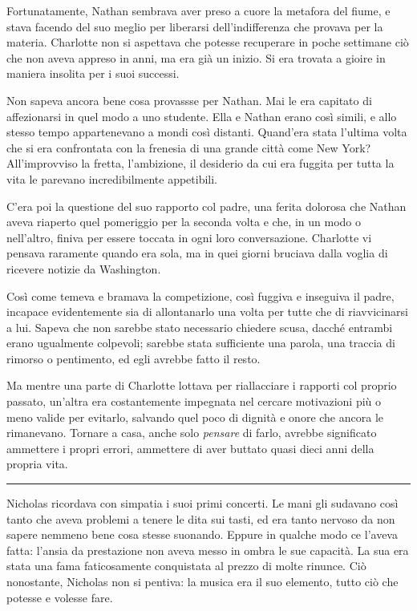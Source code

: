 \documentclass[a4paper,oneside,11pt]{memoir}
\begin{document}
Fortunatamente, Nathan sembrava aver preso a cuore la metafora del fiume, e
stava facendo del suo meglio per liberarsi dell'indifferenza che provava per la
materia. Charlotte non si aspettava che potesse recuperare in poche settimane
ciò che non aveva appreso in anni, ma era già un inizio. Si era trovata a gioire
in maniera insolita per i suoi successi.

Non sapeva ancora bene cosa provassse per Nathan. Mai le era capitato di
affezionarsi in quel modo a uno studente. Ella e Nathan erano così simili, e
allo stesso tempo appartenevano a mondi così distanti. Quand'era stata l'ultima
volta che si era confrontata con la frenesia di una grande città come New York?
All'improvviso la fretta, l'ambizione, il desiderio da cui era fuggita per tutta
la vita le parevano incredibilmente appetibili.

C'era poi la questione del suo rapporto col padre, una ferita dolorosa che
Nathan aveva riaperto quel pomeriggio per la seconda volta e che, in un modo o
nell'altro, finiva per essere toccata in ogni loro conversazione. Charlotte vi
pensava raramente quando era sola, ma in quei giorni bruciava dalla voglia di
ricevere notizie da Washington.

Così come temeva e bramava la competizione, così fuggiva e inseguiva il padre,
incapace evidentemente sia di allontanarlo una volta per tutte che di
riavvicinarsi a lui. Sapeva che non sarebbe stato necessario chiedere scusa,
dacché entrambi erano ugualmente colpevoli; sarebbe stata sufficiente una
parola, una traccia di rimorso o pentimento, ed egli avrebbe fatto il resto.

Ma mentre una parte di Charlotte lottava per riallacciare i rapporti col proprio
passato, un'altra era costantemente impegnata nel cercare motivazioni più o meno
valide per evitarlo, salvando quel poco di dignità e onore che ancora le
rimanevano. Tornare a casa, anche solo \emph{pensare} di farlo, avrebbe
significato ammettere i propri errori, ammettere di aver buttato quasi dieci
anni della propria vita.

\plainbreak{1}

Nicholas ricordava con simpatia i suoi primi concerti. Le mani gli sudavano così
tanto che aveva problemi a tenere le dita sui tasti, ed era tanto nervoso da non
sapere nemmeno bene cosa stesse suonando. Eppure in qualche modo ce l'aveva
fatta: l'ansia da prestazione non aveva messo in ombra le sue capacità. La sua
era stata una fama faticosamente conquistata al prezzo di molte rinunce. Ciò
nonostante, Nicholas non si pentiva: la musica era il suo elemento, tutto ciò
che potesse e volesse fare.
\end{document}
